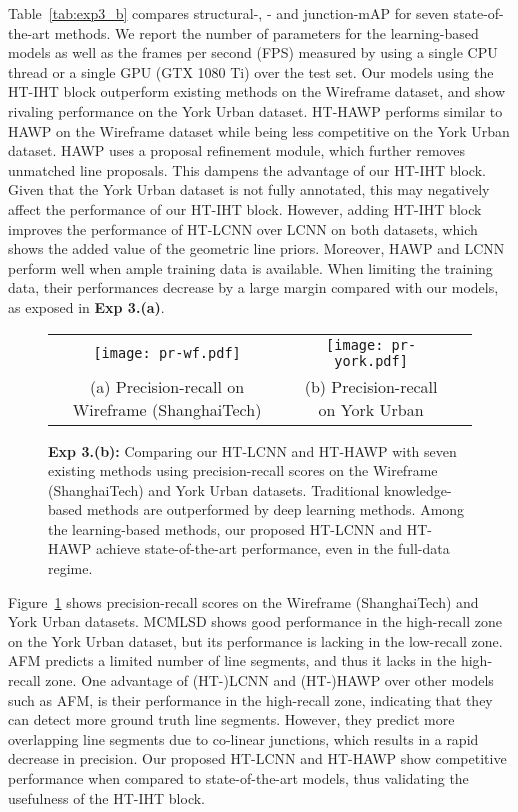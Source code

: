 \documentclass[runningheads]{llncs}
\newcommand{\model}{HT-IHT block\xspace}
\begin{document}
Table~\ref{tab:exp3_b} compares structural-, - and junction-mAP for seven state-of-the-art methods.
We report the number of parameters for the learning-based models as well as the frames per second (FPS) measured by using a single CPU thread or a single GPU (GTX 1080 Ti) over the test set.
Our models using the \model outperform existing methods on the Wireframe dataset, and show rivaling performance on the York Urban dataset.
HT-HAWP performs similar to HAWP on the Wireframe dataset while being less competitive on the York Urban dataset. 
HAWP uses a proposal refinement module, which further removes unmatched line proposals. 
This dampens the advantage of our \model.
Given that the York Urban dataset is not fully annotated, this may negatively affect the performance of our \model.
However, adding \model improves the performance of HT-LCNN over LCNN on both datasets, which shows the added value of the geometric line priors. 
Moreover, HAWP and LCNN perform well when ample training data is available. 
When limiting the training data, their performances decrease by a large margin compared with our models, as exposed in \textbf{Exp 3.(a)}.

\begin{figure}[t!]
    \centering
    \begin{tabular}{ccc}
        \texttt{[image: pr-wf.pdf]} &
        \texttt{[image: pr-york.pdf]} \\
        \scriptsize{(a) Precision-recall on Wireframe (ShanghaiTech)} & 
        \scriptsize{(b) Precision-recall on York Urban}\\
    \end{tabular}
    \caption{\textbf{Exp 3.(b):} 
    Comparing our HT-LCNN and HT-HAWP with seven existing methods using precision-recall scores on the Wireframe (ShanghaiTech) and York Urban datasets.
    Traditional knowledge-based methods are outperformed by deep learning methods.
    Among the learning-based methods, our proposed HT-LCNN and HT-HAWP achieve state-of-the-art performance, even in the full-data regime.}
    \label{fig:exp3_b}
\end{figure}

Figure~\ref{fig:exp3_b} shows precision-recall scores \cite{almazan2017mcmlsd} on the Wireframe (ShanghaiTech) and York Urban datasets.
MCMLSD \cite{almazan2017mcmlsd} shows good performance in the high-recall zone on the York Urban dataset, but its performance is lacking in the low-recall zone. 
AFM \cite{xue2019learning} predicts a limited number of line segments, and thus it lacks in the high-recall zone. 
One advantage of (HT-)LCNN and (HT-)HAWP over other models such as AFM, is their performance in the high-recall zone, indicating that they can detect more ground truth line segments. 
However, they predict more overlapping line segments due to co-linear junctions, which results in a rapid decrease in precision. 
Our proposed HT-LCNN and HT-HAWP show competitive performance when compared to state-of-the-art models, thus validating the usefulness of the \model. 
\end{document}
